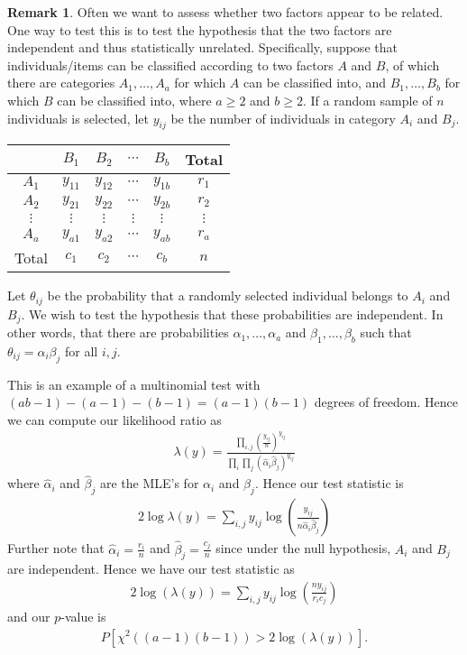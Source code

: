 \documentclass[11pt]{amsart}
\theoremstyle{definition}
\newtheorem{remark}[theorem]{Remark}
\numberwithin{equation}{section}
\begin{document}
\begin{remark}
    Often we want to assess whether two factors appear to be related. One way to test this is to test the hypothesis that the two factors are independent and thus statistically unrelated. Specifically, suppose that individuals/items can be classified according to two factors $A$ and $B$, of which there are categories $A_1,\ldots,A_a$ for which $A$ can be classified into, and $B_1,\ldots,B_b$ for which $B$ can be classified into, where $a\ge 2$ and $b\ge 2$. If a random sample of $n$ individuals is selected, let $y_{ij}$ be the number of individuals in category $A_i$ and $B_j$.
    \begin{center}
        \begin{tabular}{|c|c|c|c|c|c|}
            \hline
             & $B_1$ & $B_2$ & $\cdots$ & $B_b$ & Total \\
             \hline
             $A_1$ & $y_{11}$ & $y_{12}$ & $\cdots$ & $y_{1b}$ & $r_1$\\
             \hline
             $A_2$ & $y_{21}$ & $y_{22}$ & $\cdots$ & $y_{2b}$ & $r_2$\\
             \hline
             $\vdots$ & $\vdots$ & $\vdots$ & $\vdots$ & $\vdots$ & $\vdots$\\
             \hline
             $A_a$ & $y_{a1}$ & $y_{a2}$ & $\cdots$ & $y_{ab}$ & $r_a$\\
             \hline
             Total & $c_1$ & $c_2$ & $\cdots$ & $c_b$ & $n$\\
             \hline
        \end{tabular}
    \end{center}
    Let $\theta_{ij}$ be the probability that a randomly selected individual belongs to $A_i$ and $B_j$. We wish to test the hypothesis that these probabilities are independent. In other words, that there are probabilities $\alpha_1,\ldots,\alpha_a$ and $\beta_1,\ldots,\beta_b$ such that $\theta_{ij}=\alpha_i\beta_j$ for all $i,j$.

    This is an example of a multinomial test with $(ab-1)-(a-1)-(b-1)=(a-1)(b-1)$ degrees of freedom. Hence we can compute our likelihood ratio as
    \begin{align*}
        \lambda(y)=\frac{\prod_{i,j}\left(\frac{y_{ij}}{n}\right)^{y_{ij}}}{\prod_i\prod_j(\hat\alpha_i\hat\beta_j)^{y_{ij}}}
    \end{align*}
    where $\hat\alpha_i$ and $\hat\beta_j$ are the MLE's for $\alpha_i$ and $\beta_j$. Hence our test statistic is
    \begin{align*}
        2\log\lambda(y)=\sum_{i,j}y_{ij}\log(\frac{y_{ij}}{n\hat\alpha_i\hat\beta_j})
    \end{align*}
    Further note that $\hat\alpha_i=\frac{r_i}{n}$ and $\hat\beta_j=\frac{c_j}{n}$ since under the null hypothesis, $A_i$ and $B_j$ are independent. Hence we have our test statistic as
    \begin{align*}
        2\log(\lambda(y))=\sum_{i,j}y_{ij}\log(\frac{ny_{ij}}{r_ic_j})
    \end{align*}
    and our $p$-value is
    \begin{align*}
        P[\chi^2((a-1)(b-1))>2\log(\lambda(y))].
    \end{align*}
\end{remark}
\end{document}
